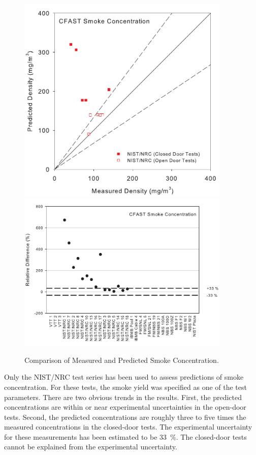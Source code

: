 \begin{figure}
\begin{center}
\includegraphics[width=4.0in]{FIGURES/ScatterPlots/Smoke}  \\
\includegraphics[width=4.0in]{FIGURES/Relative_Diff/Smoke}
\end{center}
\caption{Comparison of Measured and Predicted Smoke Concentration.} \label{fig:Smoke_Scatter}
\end{figure}

Only the NIST/NRC test series has been used to assess predictions of smoke concentration.  For these tests, the smoke yield was specified as one of the test parameters.  There are two obvious trends in the results.  First, the predicted concentrations are within or near experimental uncertainties in the open-door tests.  Second, the predicted concentrations are roughly three to five times the measured concentrations in the closed-door tests.  The experimental uncertainty for these measurements has been estimated to be 33~\%.  The closed-door tests cannot be explained from the experimental uncertainty.

